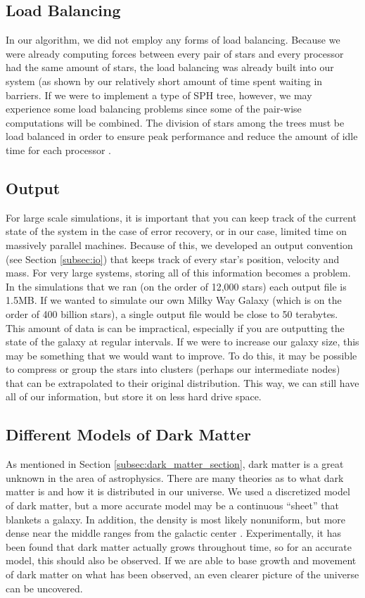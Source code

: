 \documentclass{article}
\begin{document}
\subsection{Load Balancing}

In our algorithm, we did not employ any forms of load balancing.  Because we were already computing forces between every pair of stars and every processor had the same amount of stars, the load balancing was already built into our system (as shown by our relatively short amount of time spent waiting in barriers.  If we were to implement a type of SPH tree, however, we may experience some load balancing problems since some of the pair-wise computations will be combined.  The division of stars among the trees must be load balanced in order to ensure peak performance and reduce the amount of idle time for each processor \cite{parallel-treesph}. 

\subsection{Output}

For large scale simulations, it is important that you can keep track of the current state of the system in the case of error recovery, or in our case, limited time on massively parallel machines.  Because of this, we developed an output convention (see Section \ref{subsec:io}) that keeps track of every star's position, velocity and mass.  For very large systems, storing all of this information becomes a problem.  In the simulations that we ran (on the order of 12,000 stars) each output file is 1.5MB.  If we wanted to simulate our own Milky Way Galaxy (which is on the order of 400 billion stars), a single output file would be close to 50 terabytes.  This amount of data is can be impractical, especially if you are outputting the state of the galaxy at regular intervals.  If we were to increase our galaxy size, this may be something that we would want to improve.  To do this, it may be possible to compress or group the stars into clusters (perhaps our intermediate nodes) that can be extrapolated to their original distribution. This way, we can still have all of our information, but store it on less hard drive space.  

\subsection{Different Models of Dark Matter}

As mentioned in Section \ref{subsec:dark_matter_section}, dark matter is a great unknown in the area of astrophysics.  There are many theories as to what dark matter is and how it is distributed in our universe.  We used a discretized model of dark matter, but a more accurate model may be a continuous ``sheet'' that blankets a galaxy.  In addition, the density is most likely nonuniform, but more dense near the middle ranges from the galactic center \cite{dark-halo}.  Experimentally, it has been found that dark matter actually grows throughout time, so for an accurate model, this should also be observed.  If we are able to base growth and movement of dark matter on what has been observed, an even clearer picture of the universe can be uncovered.
\end{document}

